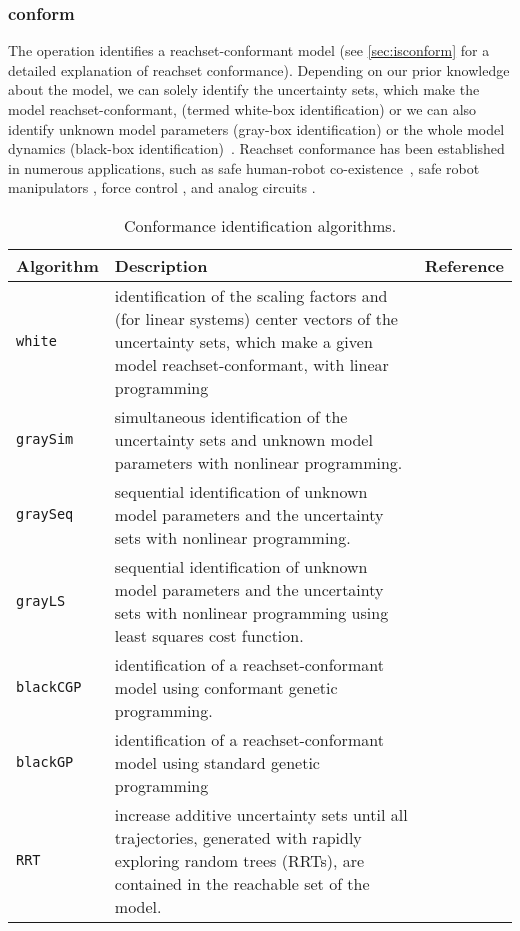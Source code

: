 \subsubsection{conform} \label{sec:conform}

The operation  identifies a reachset-conformant model (see \cref{sec:isconform} for a detailed explanation of reachset conformance). Depending on our prior knowledge about the model, we can solely identify the uncertainty sets, which make the model reachset-conformant, (termed white-box identification) or we can also identify unknown model parameters (gray-box identification) or the whole model dynamics (black-box identification)~\cite{Luetzow2024a,Luetzow2024b}.
Reachset conformance has been established in numerous applications, such as safe human-robot co-existence~\cite{Liu2017a}, safe robot manipulators \cite{Liu2018a}, force control \cite{Liu2021c}, and analog circuits \cite{Kochdumper2020b}.

\begin{table}[h]
	\caption{Conformance identification algorithms.}
	\centering
	\label{tab:confAlg}
	\begin{tabular}{l p{9cm} l}
		\toprule
		\textbf{Algorithm} & \textbf{Description} & \textbf{Reference} \\
		\midrule
		\texttt{white} & identification of the scaling factors and (for linear systems) center vectors of the uncertainty sets, which make a given model reachset-conformant, with linear programming & \cite{Luetzow2024a} \\
		\texttt{graySim} & simultaneous identification of the uncertainty sets and unknown model parameters with nonlinear programming. & \cite{Luetzow2024b} \\
		\texttt{graySeq} & sequential identification of unknown model parameters and the uncertainty sets with nonlinear programming. & \cite{Luetzow2024b} \\
		\texttt{grayLS} & sequential identification of unknown model parameters and the uncertainty sets with nonlinear programming using least squares cost function. &  \cite{Luetzow2024b} \\
		\texttt{blackCGP} & identification of a reachset-conformant model using conformant genetic programming. &  \cite{Luetzow2024b} \\
		\texttt{blackGP} & identification of a reachset-conformant model using standard genetic programming & \cite{Luetzow2024b} \\
		\texttt{RRT} & increase additive uncertainty sets until all trajectories, generated with rapidly exploring random trees (RRTs), are contained in the reachable set of the model. & \cite{Althoff2012b} \\
		\bottomrule
	\end{tabular}
\end{table}

